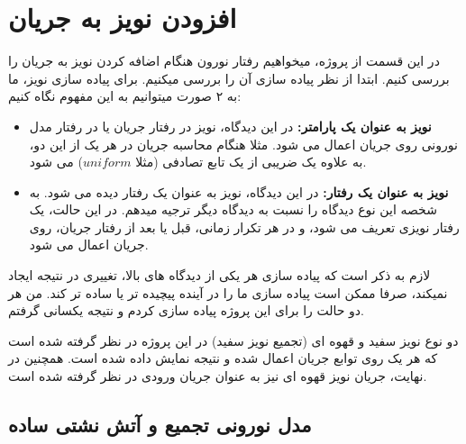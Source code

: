 \documentclass{article}
\begin{document}
    \section{افزودن نویز به جریان}
        در این قسمت از پروژه، میخواهیم رفتار نورون هنگام اضافه کردن نویز به جریان را بررسی کنیم. ابتدا از نظر پیاده سازی آن را بررسی میکنیم. برای پیاده سازی نویز، ما به ۲ صورت میتوانیم به این مفهوم نگاه کنیم:
        \begin{itemize}
            \item \textbf{نویز به عنوان یک پارامتر:} در این دیدگاه، نویز در رفتار جریان یا در رفتار مدل نورونی روی جریان اعمال می شود. مثلا هنگام محاسبه جریان در هر یک از این دو، به علاوه یک  ضریبی از یک تابع تصادفی
            (مثلا $uniform$) 
            می شود.
            \item \textbf{نویز به عنوان یک رفتار:} در این دیدگاه، نویز به عنوان یک رفتار دیده می شود. به شخصه این نوع دیدگاه را نسبت به دیدگاه دیگر ترجیه میدهم. در این حالت، یک رفتار نویزی تعریف می شود، و در هر تکرار زمانی، قبل یا بعد از رفتار جریان، روی جریان اعمال می شود.
        \end{itemize}
        لازم به ذکر است که پیاده سازی هر یکی از دیدگاه های بالا، تغییری در نتیجه ایجاد نمیکند، صرفا ممکن است پیاده سازی ما را در آینده پیچیده تر یا ساده تر کند. من هر دو حالت را برای این پروژه پیاده سازی کردم و نتیجه یکسانی گرفتم.
        
        دو نوع نویز سفید و قهوه ای
        (تجمیع نویز سفید)
        در این پروژه در نظر گرفته شده است که هر یک روی توابع جریان اعمال شده و نتیجه نمایش داده شده است. همچنین در نهایت، جریان نویز قهوه ای نیز به عنوان جریان ورودی در نظر گرفته شده است.

        \subsection{مدل نورونی تجمیع و آتش نشتی ساده}
\end{document}
